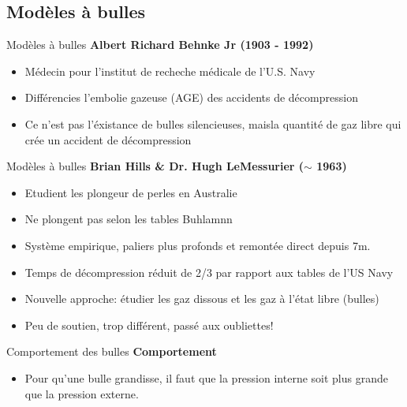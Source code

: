 \subsection{Modèles à bulles}

\begin{frame}{Modèles à bulles}
	\textbf{Albert Richard Behnke Jr (1903 - 1992)}  
	\begin{itemize}
		\item Médecin pour l'institut de recheche médicale de l'U.S. Navy
		\item Différencies l'embolie gazeuse (AGE) des accidents de décompression
		\item Ce n'est pas l'éxistance de bulles silencieuses, maisla quantité de gaz libre qui crée un accident de décompression
	\end{itemize}
\end{frame}

\begin{frame}{Modèles à bulles}  
	\textbf{Brian Hills \& Dr. Hugh LeMessurier ($\sim$ 1963)}
	\begin{itemize}
		\item Etudient les plongeur de perles en Australie
		\item Ne plongent pas selon les tables Buhlamnn
		\item Système empirique, paliers plus profonds et remontée direct depuis 7m.
		\item Temps de décompression réduit de 2/3 par rapport aux tables de l'US Navy
		\item Nouvelle approche: étudier les gaz dissous et les gaz à l'état libre (bulles)
		\item Peu de soutien, trop différent, passé aux oubliettes!
	\end{itemize}
\end{frame}


\begin{frame}{Comportement des bulles}  
	\textbf{Comportement}
	\begin{itemize}
	\item  Pour qu'une bulle grandisse, il faut que la pression interne soit plus grande que la pression externe.
	\end{itemize}
\end{frame}


